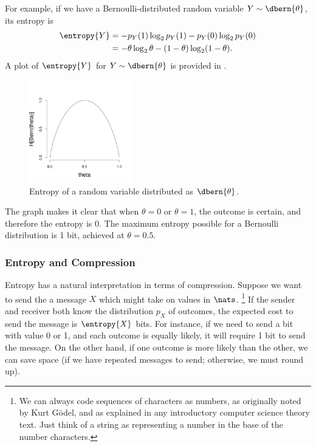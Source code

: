 For example, if we have a Bernoulli-distributed random
variable $Y \sim \dbern{\theta}$, its entropy is
%
\begin{align}
\entropy{Y} &= - p_Y(1) \log_2 p_Y(1) - p_Y(0) \log_2 p_Y(0)
\\
&= - \theta \log_2 \theta - (1 - \theta) \log_2 (1 - \theta).
\end{align}
%
A plot of $\entropy{Y}$ for $Y \sim \dbern{\theta}$ is provided
in .
%
\begin{figure}
\begin{center}
\includegraphics[height=1.75in]{pdfs/bern-entropy.pdf}
\end{center}%
\vspace*{-18pt}
\caption{Entropy of a random variable distributed as $\dbern{\theta}$.}\label{fig:bern-entropy}
\end{figure}
%
The graph makes it clear that when $\theta=0$ or $\theta=1$, the
outcome is certain, and therefore the entropy is 0.  The maximum
entropy possible for a Bernoulli distribution is 1 bit, achieved at
$\theta = 0.5$.  


\subsubsection{Entropy and Compression}

Entropy has a natural interpretation in terms of compression.  Suppose
we want to send the a message $X$ which might take on values in
$\nats$.%
%
\footnote{We can always code sequences of characters as numbers, as
originally noted by Kurt G\"odel, and as explained in any introductory
computer science theory text.  Just think of a string as representing
a number in the base of the number characters.}
%
If the sender and receiver both know the distribution $p_X$
of outcomes, the expected cost to send the message is $\entropy{X}$
bits.  For instance, if we need to send a bit with value 0 or 1, and
each outcome is equally likely, it will require 1 bit to send the
message.  On the other hand, if one outcome is more likely than the
other, we can save space (if we have repeated messages to send;
otherwise, we must round up).


